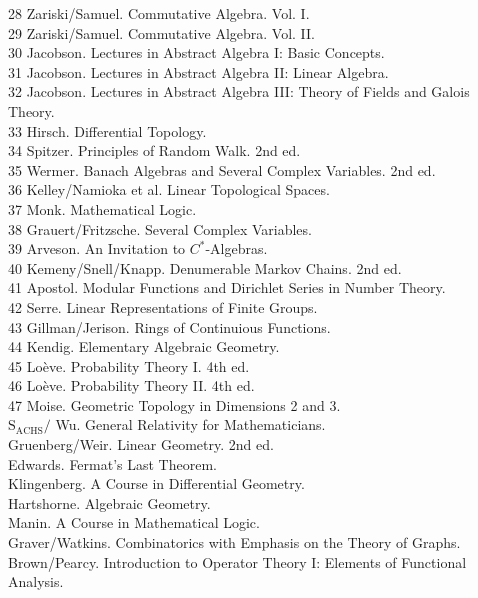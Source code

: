 \documentclass[10pt]{article}
\begin{document}
28 Zariski/Samuel. Commutative Algebra. Vol. I.\\
29 Zariski/Samuel. Commutative Algebra. Vol. II.\\
30 Jacobson. Lectures in Abstract Algebra I: Basic Concepts.\\
31 Jacobson. Lectures in Abstract Algebra II: Linear Algebra.\\
32 Jacobson. Lectures in Abstract Algebra III: Theory of Fields and Galois Theory.\\
33 Hirsch. Differential Topology.\\
34 Spitzer. Principles of Random Walk. 2nd ed.\\
35 Wermer. Banach Algebras and Several Complex Variables. 2nd ed.\\
36 Kelley/Namioka et al. Linear Topological Spaces.\\
37 Monk. Mathematical Logic.\\
38 Grauert/Fritzsche. Several Complex Variables.\\
39 Arveson. An Invitation to $C^{*}$-Algebras.\\
40 Kemeny/Snell/Knapp. Denumerable Markov Chains. 2nd ed.\\
41 Apostol. Modular Functions and Dirichlet Series in Number Theory.\\
42 Serre. Linear Representations of Finite Groups.\\
43 Gillman/Jerison. Rings of Continuious Functions.\\
44 Kendig. Elementary Algebraic Geometry.\\
45 Loève. Probability Theory I. 4th ed.\\
46 Loève. Probability Theory II. 4th ed.\\
47 Moise. Geometric Topology in Dimensions 2 and 3.\\
$\mathrm{S}_{\mathrm{ACHS}} /$ Wu. General Relativity for Mathematicians.\\
Gruenberg/Weir. Linear Geometry. 2nd ed.\\
Edwards. Fermat's Last Theorem.\\
Klingenberg. A Course in Differential Geometry.\\
Hartshorne. Algebraic Geometry.\\
Manin. A Course in Mathematical Logic.\\
Graver/Watkins. Combinatorics with Emphasis on the Theory of Graphs.\\
Brown/Pearcy. Introduction to Operator Theory I: Elements of Functional Analysis.\\
\end{document}
